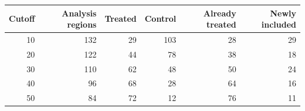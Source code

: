 \begin{tabular}{rrrrrr}
\toprule
Cutoff & Analysis regions & Treated & Control & Already treated & Newly included\\
\midrule
10 & 132 & 29 & 103 & 28 & 29\\
20 & 122 & 44 & 78 & 38 & 18\\
30 & 110 & 62 & 48 & 50 & 24\\
40 & 96 & 68 & 28 & 64 & 16\\
50 & 84 & 72 & 12 & 76 & 11\\
\bottomrule
\end{tabular}
